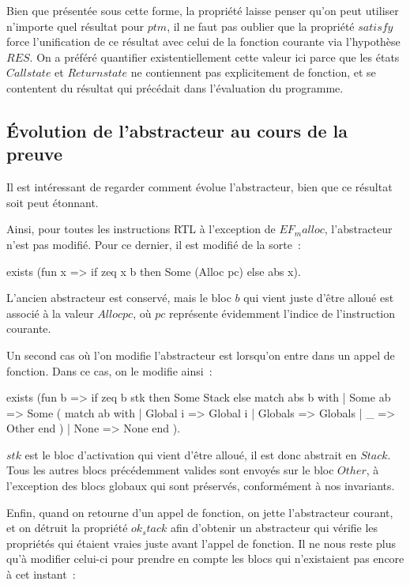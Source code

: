 \documentclass{article}
\begin{document}
Bien que présentée sous cette forme, la propriété laisse penser qu'on peut
utiliser n'importe quel résultat pour $ptm$, il ne faut pas oublier
que la propriété $satisfy$ force l'unification de ce résultat avec
celui de la fonction courante via l'hypothèse $RES$. On a préféré
quantifier existentiellement cette valeur ici parce que les états
$Callstate$ et $Returnstate$ ne contiennent pas
explicitement de fonction, et se contentent du résultat qui précédait dans
l'évaluation du programme.

\subsection{Évolution de l'abstracteur au cours de la preuve}

Il est intéressant de regarder comment évolue l'abstracteur, bien que ce
résultat soit peut étonnant.

Ainsi, pour toutes les instructions RTL à l'exception de
$EF_malloc$, l'abstracteur n'est pas modifié. Pour ce dernier,
il est modifié de la sorte~:

\begin{coq}
exists (fun x => if zeq x b then Some (Alloc pc) else abs x).
\end{coq}

L'ancien abstracteur est conservé, mais le bloc $b$ qui vient juste
d'être alloué est associé à la valeur $Alloc pc$, où
$pc$ représente évidemment l'indice de l'instruction courante.

Un second cas où l'on modifie l'abstracteur est lorsqu'on entre dans un appel
de fonction. Dans ce cas, on le modifie ainsi~:

\begin{coq}
exists (fun b =>
if zeq b stk then Some Stack else
  match abs b with
  | Some ab => Some
  (
      match ab with
      | Global i => Global i
      | Globals  => Globals
      | _        => Other
      end
  )
  | None    => None
  end
).
\end{coq}

$stk$ est le bloc d'activation qui vient d'être alloué, il est donc
abstrait en $Stack$. Tous les autres blocs précédemment valides
sont envoyés sur le bloc $Other$, à l'exception des blocs globaux
qui sont préservés, conformément à nos invariants.

Enfin, quand on retourne d'un appel de fonction, on jette l'abstracteur
courant, et on détruit la propriété $ok_stack$ afin d'obtenir un
abstracteur qui vérifie les propriétés qui étaient vraies juste avant l'appel
de fonction. Il ne nous reste plus qu'à modifier celui-ci pour prendre en
compte les blocs qui n'existaient pas encore à cet instant~:
\end{document}
